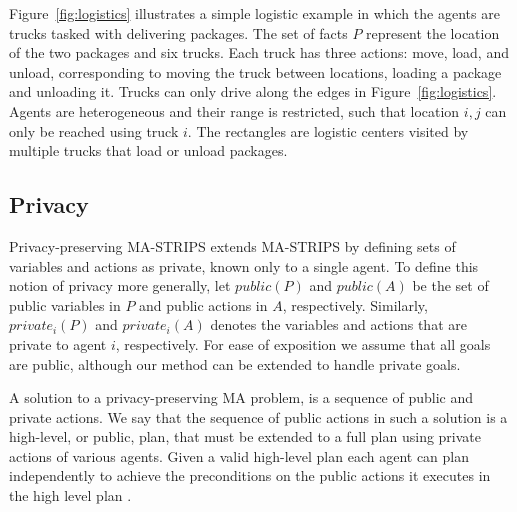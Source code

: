 \documentclass[letterpaper]{article}
\theoremstyle{definition}
\begin{document}


Figure~\ref{fig:logistics} illustrates a simple logistic example in which the agents are trucks tasked with delivering packages. %
The set of facts $P$ represent the location of the two packages and six trucks. Each truck has three actions: move, load, and unload, corresponding to moving the truck between locations, loading a package and unloading it. Trucks can only drive along the edges in Figure~\ref{fig:logistics}. Agents are heterogeneous  and their range is restricted, such that location $i,j$ can only be reached using truck $i$. The rectangles are logistic centers visited by multiple trucks that load or unload packages. 

\subsection{Privacy}

Privacy-preserving MA-STRIPS extends MA-STRIPS by defining sets of variables and actions as private, known only to a single agent. To define this notion of privacy more generally, let $public(P)$ and $public(A)$ be the set of public variables in $P$ and public actions in $A$, respectively. Similarly, $private_i(P)$ and $private_i(A)$ denotes the variables and actions that are private to agent $i$, respectively. For ease of exposition we assume that all goals are public, although our method can be extended to handle private goals.

A solution to a privacy-preserving MA problem, is a sequence of public and private actions. We say that the sequence of public actions in such a solution is a high-level, or public, plan, that must be extended to a full plan using private actions of various agents. Given a valid high-level plan each agent can plan independently to achieve the preconditions on the public actions it executes in the high level plan \cite{maliah2014privacyPreserving}.
\end{document}
